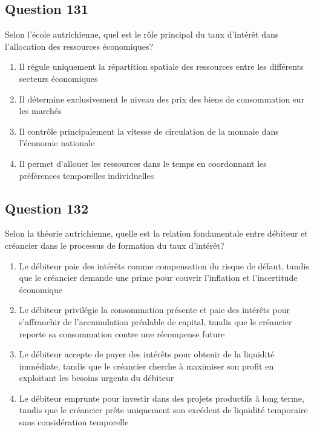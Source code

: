 \documentclass[12pt,a4paper]{article}
\begin{document}
\bigskip


\subsection*{Question 131}
Selon l'école autrichienne, quel est le rôle principal du taux d'intérêt dans l'allocation des ressources économiques?

\begin{enumerate}[label=\Alph*., leftmargin=*]
\item Il régule uniquement la répartition spatiale des ressources entre les différents secteurs économiques
\item Il détermine exclusivement le niveau des prix des biens de consommation sur les marchés
\item Il contrôle principalement la vitesse de circulation de la monnaie dans l'économie nationale
\item Il permet d'allouer les ressources dans le temps en coordonnant les préférences temporelles individuelles
\end{enumerate}

\bigskip


\subsection*{Question 132}
Selon la théorie autrichienne, quelle est la relation fondamentale entre débiteur et créancier dans le processus de formation du taux d'intérêt?

\begin{enumerate}[label=\Alph*., leftmargin=*]
\item Le débiteur paie des intérêts comme compensation du risque de défaut, tandis que le créancier demande une prime pour couvrir l'inflation et l'incertitude économique
\item Le débiteur privilégie la consommation présente et paie des intérêts pour s'affranchir de l'accumulation préalable de capital, tandis que le créancier reporte sa consommation contre une récompense future
\item Le débiteur accepte de payer des intérêts pour obtenir de la liquidité immédiate, tandis que le créancier cherche à maximiser son profit en exploitant les besoins urgents du débiteur
\item Le débiteur emprunte pour investir dans des projets productifs à long terme, tandis que le créancier prête uniquement son excédent de liquidité temporaire sans considération temporelle
\end{enumerate}
\end{document}
